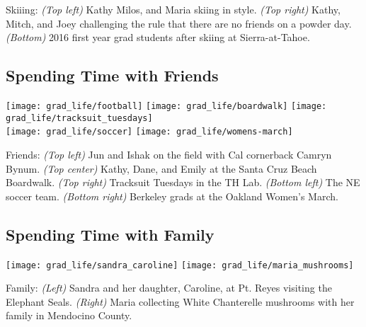 Skiiing: 
\textit{(Top left)} Kathy Milos, and Maria skiing in style. 
\textit{(Top right)} Kathy, Mitch, and Joey challenging the rule that there are no friends on a powder day. 
\textit{(Bottom)} 2016 first year grad students after skiing at Sierra-at-Tahoe.


\subsection*{Spending Time with Friends}

\begin{minipage}{\textwidth}
  \begin{center}
    \texttt{[image: grad\_life/football]}
    \texttt{[image: grad\_life/boardwalk]}
    \texttt{[image: grad\_life/tracksuit\_tuesdays]}\\
    \vspace{0.2cm}
    \texttt{[image: grad\_life/soccer]}
		\texttt{[image: grad\_life/womens-march]}
  \end{center}
\end{minipage}

Friends: 
\textit{(Top left)} Jun and Ishak on the field with Cal cornerback Camryn Bynum.
\textit{(Top center)} Kathy, Dane, and Emily at the Santa Cruz Beach Boardwalk.
\textit{(Top right)} Tracksuit Tuesdays in the TH Lab.
\textit{(Bottom left)} The NE soccer team.
\textit{(Bottom right)} Berkeley grads at the Oakland Women’s March.


\subsection*{Spending Time with Family}

\begin{minipage}{\textwidth}
  \begin{center}
    \texttt{[image: grad\_life/sandra\_caroline]}
    \texttt{[image: grad\_life/maria\_mushrooms]}\\
  \end{center}
\end{minipage}

Family:
\textit{(Left)} Sandra and her daughter, Caroline, at Pt. Reyes visiting the Elephant Seals.
\textit{(Right)} Maria collecting White Chanterelle mushrooms with her family in Mendocino County.
